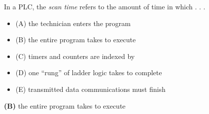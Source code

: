 

In a PLC, the {\it scan time} refers to the amount of time in which . . .

\begin{itemize}
\item{(A)} the technician enters the program
\vskip 5pt 
\item{(B)} the entire program takes to execute
\vskip 5pt 
\item{(C)} timers and counters are indexed by
\vskip 5pt 
\item{(D)} one ``rung'' of ladder logic takes to complete
\vskip 5pt 
\item{(E)} transmitted data communications must finish
\end{itemize}







{\bf (B)} the entire program takes to execute
 










